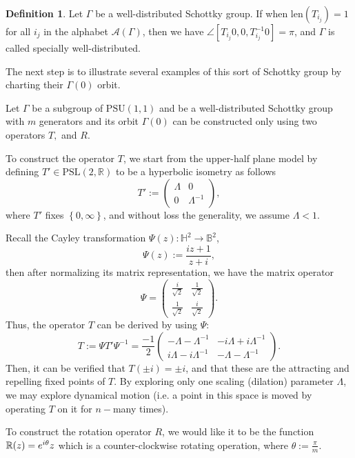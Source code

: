 \documentclass[12pt,oneside]{sfsuthesis}
\theoremstyle{plain} %
\theoremstyle{definition}  %
\newtheorem{definition}{Definition}[chapter]
\theoremstyle{remark}  %
\theoremstyle{plain}
\begin{document}
{\begin{definition}
Let $\Gamma$ be a well-distributed Schottky group. If when $\text{len}(T_{i_j})=1$ for all $i_j$ in the alphabet $\mathcal{A}(\Gamma)$, then we have $\angle[T_{i_j}0,0,T_{i_j}^{-1}0]=\pi$, and $\Gamma$ is called specially well-distributed.
\end{definition}


The next step is to illustrate several examples of this sort of Schottky group by charting their $\Gamma(0)$ orbit.

Let $\Gamma$ be a subgroup of $\text{PSU}(1,1)$ and be a well-distributed Schottky group with $m$ generators and its orbit $\Gamma(0)$ can be constructed only using two operators $T,$ and $R$.

To construct the operator $T$, we start from the upper-half plane model by defining $T'\in\text{PSL}(2,\mathbb{R})$ to be a hyperbolic isometry as follows
$$
T':=\begin{pmatrix}
\Lambda &  0 \\
0 &  \Lambda^{-1}
\end{pmatrix},
$$
where $T'$ fixes $\left\lbrace 0,\infty \right\rbrace$, and without loss the generality, we assume $\Lambda<1$.

Recall the Cayley transformation $\Psi(z):\mathbb{H}^2\to\mathbb{B}^2$,
$$
\Psi(z):=\frac{iz+1}{z+i}, 
$$
then after normalizing its matrix representation, we have the matrix operator
$$
\Psi=\begin{pmatrix}
\frac{i}{\sqrt{2}} &  \frac{1}{\sqrt{2}} \\
\frac{1}{\sqrt{2}} &  \frac{i}{\sqrt{2}}
\end{pmatrix}.
$$
Thus, the operator $T$ can be derived by using $\Psi$:
$$
T:=\Psi T'\Psi^{-1}=\frac{-1}{2}\begin{pmatrix}
-\Lambda-\Lambda^{-1} &  -i\Lambda+i\Lambda^{-1}  \\
i\Lambda-i\Lambda^{-1} &  -\Lambda-\Lambda^{-1} 
\end{pmatrix}.
$$
Then, it can be verified that $T(\pm i)=\pm i$, and that these are the attracting and repelling fixed points of $T$. By exploring only one scaling (dilation) parameter $\Lambda$, we may explore dynamical motion (i.e. a point in this space is moved by operating $T$ on it for $n-$many times).


To construct the rotation operator $R$, we would like it to be the function $\mathbb{R}(z)=e^{i \theta }z$ which is a counter-clockwise rotating operation, where $\theta:=\frac{\pi}{m}$.

}
\end{document}
